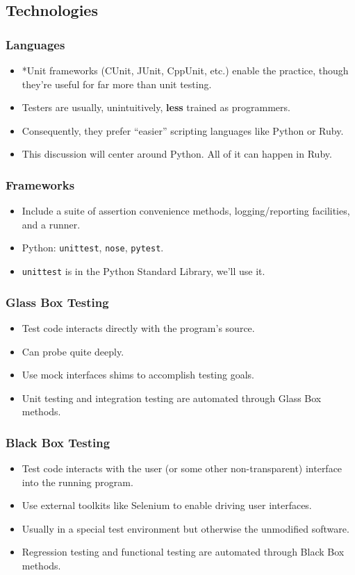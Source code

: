 \subsection{Technologies}

\begin{frame}
  \frametitle{Languages}
  \begin{itemize}
    \item *Unit frameworks (CUnit, JUnit, CppUnit, etc.) enable the practice, though they're useful for far more than unit testing.
    \item Testers are usually, unintuitively, \textbf{less} trained as programmers.
    \item Consequently, they prefer ``easier'' scripting languages like Python or Ruby.
    \item This discussion will center around Python. All of it can happen in Ruby.
  \end{itemize}
\end{frame}

\begin{frame}
  \frametitle{Frameworks}
  \begin{itemize}
    \item Include a suite of assertion convenience methods, logging/reporting facilities, and a runner.
    \item Python: \texttt{unittest}, \texttt{nose}, \texttt{pytest}.
    \item \texttt{unittest} is in the Python Standard Library, we'll use it.
  \end{itemize}
\end{frame}

\begin{frame}
  \frametitle{Glass Box Testing}
  \begin{itemize}
    \item Test code interacts directly with the program's source.
    \item Can probe quite deeply.
    \item Use mock interfaces shims to accomplish testing goals.
    \item Unit testing and integration testing are automated through Glass Box methods.
  \end{itemize}
\end{frame}

\begin{frame}
  \frametitle{Black Box Testing}
  \begin{itemize}
    \item Test code interacts with the user (or some other non-transparent) interface into the running program.
    \item Use external toolkits like Selenium to enable driving user interfaces.
    \item Usually in a special test environment but otherwise the unmodified software.
    \item Regression testing and functional testing are automated through Black Box methods.
  \end{itemize}
\end{frame}

